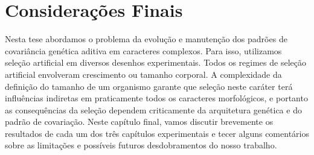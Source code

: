 \pagestyle{empty}
\cleardoublepage
\pagestyle{fancy}



\chapter{Considerações Finais}

\begin{refsection}

Nesta tese abordamos o problema da evolução e manutenção dos padrões de
covariância genética aditiva em caracteres complexos. Para isso, utilizamos
seleção artificial em diversos desenhos experimentais. Todos os regimes de
seleção artificial envolveram crescimento ou tamanho corporal. A complexidade
da definição do tamanho de um organismo garante que seleção neste caráter terá
influências indiretas em praticamente todos os caracteres morfológicos, e
portanto as consequências da seleção dependem criticamente da arquitetura
genética e do padrão de covariação. Neste capítulo final, vamos discutir
brevemente os resultados de cada um dos três capítulos experimentais e tecer
alguns comentários sobre as limitações e possíveis futuros desdobramentos do
nosso trabalho.


\end{refsection}
